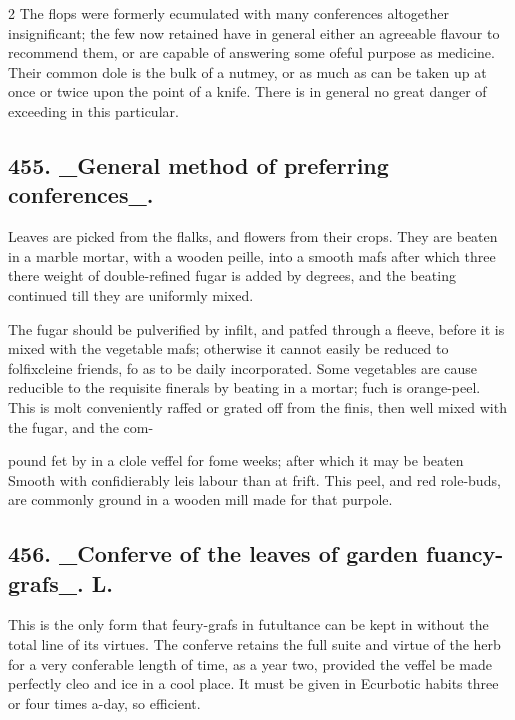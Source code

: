 \documentclass[10pt]{article}
\begin{document}
\begin{multicols}{2}
The flops were formerly ecumulated with many conferences altogether insignificant; the few now retained have in general either an agreeable flavour to recommend them, or are capable of answering some ofeful purpose as medicine. Their common dole is the bulk of a nutmey, or as much as can be taken up at once or twice upon the point of a knife. There is in general no great danger of exceeding in this particular.

\subsection*{455. \_General method of preferring conferences\_.}
Leaves are picked from the flalks, and flowers from their crops. They are beaten in a marble mortar, with a wooden peille, into a smooth mafs after which three there weight of double-refined fugar is added by degrees, and the beating continued till they are uniformly mixed.

The fugar should be pulverified by infilt, and patfed through a fleeve, before it is mixed with the vegetable mafs; otherwise it cannot easily be reduced to folfixcleine friends, fo as to be daily incorporated. Some vegetables are cause reducible to the requisite finerals by beating in a mortar; fuch is orange-peel. This is molt conveniently raffed or grated off from the finis, then well mixed with the fugar, and the com-

pound fet by in a clole veffel for fome weeks; after which it may be beaten Smooth with confidierably leis labour than at frift. This peel, and red role-buds, are commonly ground in a wooden mill made for that purpole.

\subsection*{456. \_Conferve of the leaves of garden fuancy-grafs\_. L.}
This is the only form that feury-grafs in futultance can be kept in without the total line of its virtues. The conferve retains the full suite and virtue of the herb for a very conferable length of time, as a year two, provided the veffel be made perfectly cleo and ice in a cool place. It must be given in Ecurbotic habits three or four times a-day, so efficient.


\end{multicols}
\end{document}
